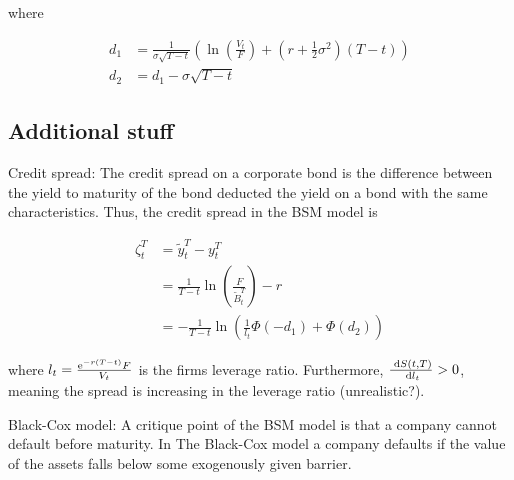 where

$$
\begin{aligned}
d_{1} & =\frac{1}{\sigma \sqrt{T-t}}\left(\ln \left(\frac{V_{t}}{F}\right)+\left(r+\frac{1}{2} \sigma^{2}\right)(T-t)\right) \\
d_{2} & =d_{1}-\sigma \sqrt{T-t}
\end{aligned}
$$

\subsection{Additional stuff}
Credit spread: The credit spread on a corporate bond is the difference between the yield to maturity of the bond deducted the yield on a bond with the same characteristics. Thus, the credit spread in the BSM model is

$$
\begin{aligned}
\zeta_{t}^{T} & =\tilde{y}_{t}^{T}-y_{t}^{T} \\
& =\frac{1}{T-t} \ln \left(\frac{F}{\tilde{B}_{t}^{T}}\right)-r \\
& =-\frac{1}{T-t} \ln \left(\frac{1}{l_{t}} \Phi\left(-d_{1}\right)+\Phi\left(d_{2}\right)\right)
\end{aligned}
$$

where $l_{t}=\frac{\mathrm{e}^{-r(T-t)} F}{V_{t}}$ is the firms leverage ratio. Furthermore, $\frac{\text{ d}  S(t, T)}{\text{ d}  l_{t}}>0$, meaning the spread is increasing in the leverage ratio (unrealistic?).

Black-Cox model: A critique point of the BSM model is that a company cannot default before maturity. In The Black-Cox model a company defaults if the value of the assets falls below some exogenously given barrier.

